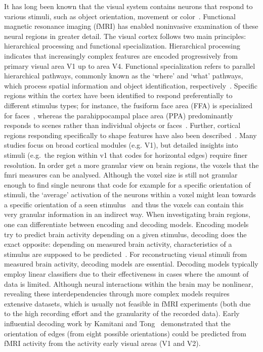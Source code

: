 It has long been known that the visual system contains neurons that respond to various stimuli, such as object orientation, movement or color~\cite{grill-spectorHUMANVISUALCORTEX2004}. Functional magnetic resonance imaging (fMRI) has enabled noninvasive examination of these neural regions in greater detail. The visual cortex follows two main principles: hierarchical processing and functional specialization. Hierarchical processing indicates that increasingly complex features are encoded progressively from primary visual area V1 up to area V4. Functional specialization refers to parallel hierarchical pathways, commonly known as the `where' and `what' pathways, which process spatial information and object identification, respectively~\cite{grill-spectorHUMANVISUALCORTEX2004,ungerleiderWhatWhereHuman1994}. Specific regions within the cortex have been identified to respond preferentially to different stimulus types; for instance, the fusiform face area (FFA) is specialized for faces~\cite{kanwisherFusiformFaceArea1997}, whereas the parahippocampal place area (PPA) predominantly responds to scenes rather than individual objects or faces~\cite{epsteinCorticalRepresentationLocal1998}. Further, cortical regions responding specifically to shape features have also been described~\cite{kourtziCorticalRegionsInvolved2000}. Many studies focus on broad cortical modules (e.g. V1), but detailed insights into stimuli (e.g.\ the region within v1 that codes for horizontal edges) require finer resolution. In order get a more granular view on brain regions, the voxels that the fmri measures can be analysed. Although the voxel size is still not granular enough to find single neurons that code for example for a specific orientation of stimuli, the `average' activation of the neurons within a voxel might lean towards a specific orientation of a seen stimulus~\cite{kamitaniDecodingVisualSubjective2005} and thus the voxels can contain this very granular information in an indirect way. When investigating brain regions, one can differentiate between encoding and decoding models. Encoding models try to predict brain activity depending on a given stimulus, decoding does the exact opposite: depending on measured brain activity, characteristics of a stimulus are supposed to be predicted~\cite{naselarisEncodingDecodingFMRI2011}. For reconstructing visual stimuli from measured brain activity, decoding models are essential. Decoding models typically employ linear classifiers due to their effectiveness in cases where the amount of data is limited. Although neural interactions within the brain may be nonlinear, revealing these interdependencies through more complex models requires extensive datasets, which is usually not feasible in fMRI experiments (both due to the high recording effort and the granularity of the recorded data). Early influential decoding work by Kamitani and Tong~\cite{kamitaniDecodingVisualSubjective2005} demonstrated that the orientation of edges (from eight possible orientations) could be predicted from fMRI activity from the activity early visual areas (V1 and V2). 

